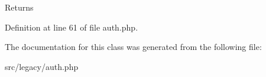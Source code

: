 \begin{DoxyReturn}{\-Returns}

\end{DoxyReturn}


\-Definition at line 61 of file auth.\-php.




\-The documentation for this class was generated from the following file\-:\begin{DoxyCompactItemize}
\item 
src/legacy/auth.\-php\end{DoxyCompactItemize}
